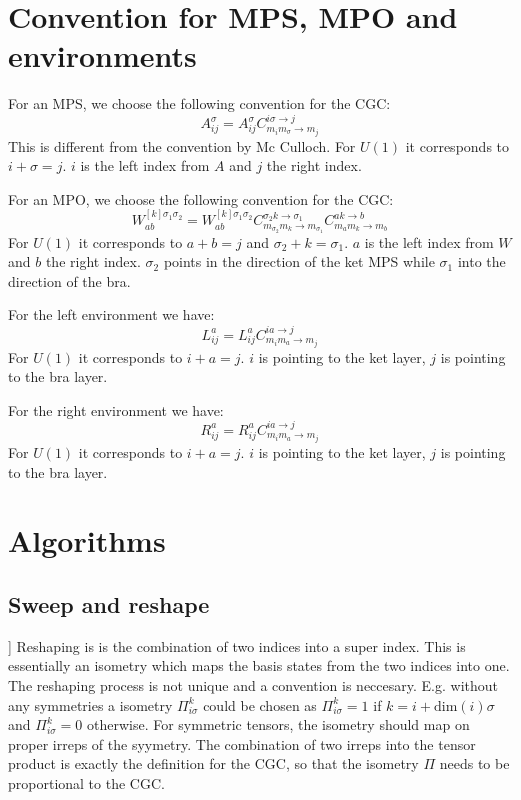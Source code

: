 \documentclass[a4paper,10pt,parskip=full]{scrartcl}
\begin{document}
\section{Convention for MPS, MPO and environments}
For an MPS, we choose the following convention for the CGC:
\begin{equation}
  \label{eq:mps-def}
  A^\sigma_{ij} = A^\sigma_{ij}C^{i\sigma\rightarrow j}_{m_im_\sigma\rightarrow m_j}
\end{equation}
This is different from the convention by Mc Culloch. For $U(1)$ it corresponds to $i+\sigma=j$.
$i$ is the left index from $A$ and $j$ the right index.

For an MPO, we choose the following convention for the CGC:
\begin{equation}
  \label{eq:mpo-def}
  W^{[k]\sigma_1\sigma_2}_{ab} = W^{[k]\sigma_1\sigma_2}_{ab}C^{\sigma_2k\rightarrow \sigma_1}_{m_{\sigma_2}m_k\rightarrow m_{\sigma_1}}
  C^{ak\rightarrow b}_{m_am_k\rightarrow m_b}
\end{equation}
For $U(1)$ it corresponds to $a+b=j$ and $\sigma_2+k=\sigma_1$.
$a$ is the left index from $W$ and $b$ the right index.
$\sigma_2$ points in the direction of the ket MPS while $\sigma_1$ into the direction of the bra.

For the left environment we have:
\begin{equation}
  \label{eq:left-def}
  L^a_{ij} = L^a_{ij}C^{ia\rightarrow j}_{m_im_a\rightarrow m_j}
\end{equation}
For $U(1)$ it corresponds to $i+a=j$. $i$ is pointing to the ket layer, $j$
is pointing to the bra layer.

For the right environment we have:
\begin{equation}
  \label{eq:right-def}
  R^a_{ij} = R^a_{ij}C^{ia\rightarrow j}_{m_im_a\rightarrow m_j}
\end{equation}
For $U(1)$ it corresponds to $i+a=j$. $i$ is pointing to the ket layer, $j$
is pointing to the bra layer.

\section{Algorithms}
\subsection{Sweep and reshape}]
Reshaping is is the combination of two indices into a super index.
This is essentially an isometry which maps the basis states from the
two indices into one. The reshaping process is not unique and a convention is neccesary.
E.g. without any symmetries a isometry $\Pi_{i\sigma}^k$ could be chosen as
$\Pi_{i\sigma}^k=1$ if $k=i+\text{dim}(i)\sigma$ and $\Pi_{i\sigma}^k=0$ otherwise.
For symmetric tensors, the isometry should map on proper irreps of the syymetry.
The combination of two irreps into the tensor product is exactly the definition
for the CGC, so that the isometry $\Pi$ needs to be proportional to the CGC.
\end{document}
